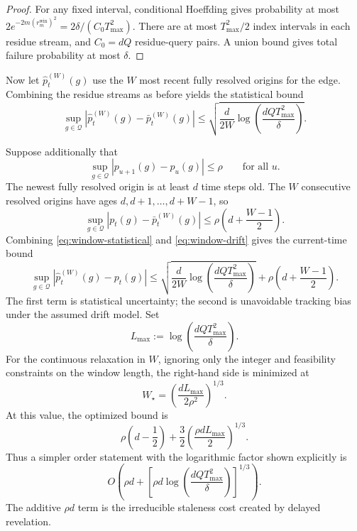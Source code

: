\documentclass[11pt]{article}
\newcommand{\Q}{\mathcal{Q}}
\newcommand{\1}{\mathbf{1}}
\begin{document}
\begin{proof}
For any fixed interval, conditional Hoeffding gives probability at most
$2e^{-2m(r_m^{\mathrm{win}})^2}=2\delta/(C_0T_{\max}^2)$.
There are at most $T_{\max}^2/2$ index intervals in each residue stream, and
$C_0=dQ$ residue-query pairs.  A union bound gives total failure probability at
most $\delta$.
\end{proof}

Now let $\widehat p_t^{(W)}(g)$ use the $W$ most recent fully resolved origins
for the edge.  Combining the residue streams as before yields the statistical
bound
\begin{equation}
    \sup_{g\in\Q}
    \left|
        \widehat p_t^{(W)}(g)
        -
        \bar p_t^{(W)}(g)
    \right|
    \le
    \sqrt{
        \frac{d}{2W}
        \log\!\left(
            \frac{dQ T_{\max}^2}{\delta}
        \right)
    }.
    \label{eq:window-statistical}
\end{equation}

Suppose additionally that
\begin{equation}
    \sup_{g\in\Q}|p_{u+1}(g)-p_u(g)|\le\rho
    \qquad\text{for all }u.
    \label{eq:rho-drift}
\end{equation}
The newest fully resolved origin is at least $d$ time steps old.  The $W$
consecutive resolved origins have ages $d,d+1,\ldots,d+W-1$, so
\begin{equation}
    \sup_{g\in\Q}
    |p_t(g)-\bar p_t^{(W)}(g)|
    \le
    \rho\left(d+\frac{W-1}{2}\right).
    \label{eq:window-drift}
\end{equation}
Combining \eqref{eq:window-statistical} and \eqref{eq:window-drift} gives the
current-time bound
\begin{equation}
\boxed{
    \sup_{g\in\Q}
    \left|
        \widehat p_t^{(W)}(g)-p_t(g)
    \right|
    \le
    \sqrt{
        \frac{d}{2W}
        \log\!\left(
            \frac{dQ T_{\max}^2}{\delta}
        \right)
    }
    +
    \rho\left(d+\frac{W-1}{2}\right).
}
\label{eq:window-current-final}
\end{equation}
The first term is statistical uncertainty; the second is unavoidable tracking
bias under the assumed drift model.  Set
\[
    L_{\max}
    :=
    \log\!\left(\frac{dQ T_{\max}^2}{\delta}\right).
\]
For the continuous relaxation in $W$, ignoring only the integer and feasibility
constraints on the window length, the right-hand side is minimized at
\[
    W_{\star}
    =
    \left(
        \frac{dL_{\max}}{2\rho^2}
    \right)^{1/3}.
\]
At this value, the optimized bound is
\[
    \rho\left(d-\frac12\right)
    +
    \frac32
    \left(
        \frac{\rho dL_{\max}}{2}
    \right)^{1/3}.
\]
Thus a simpler order statement with the logarithmic factor shown explicitly is
\[
    O\!\left(
        \rho d
        +
        \left[
            \rho d
            \log\!\left(\frac{dQ T_{\max}^2}{\delta}\right)
        \right]^{1/3}
    \right).
\]
The additive $\rho d$ term is the irreducible staleness cost created by delayed
revelation.
\end{document}
